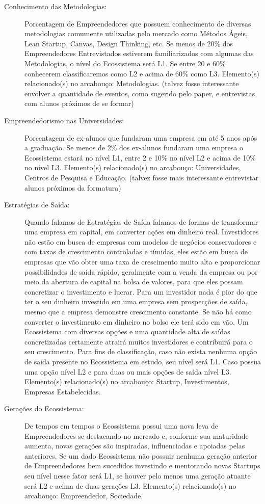 \begin{description}
  \item [Conhecimento das Metodologias:] Porcentagem de Empreendedores que possuem conhecimento de diversas metodologias comumente utilizadas pelo mercado como Métodos Ágeis, Lean Startup, Canvas, Design Thinking, etc. Se menos de 20\% dos Empreendedores Entrevistados estiverem familiarizados com algumas das Metodologias, o nível do Ecossistema será L1. Se entre 20 e 60\% conhecerem classificaremos como L2 e acima de 60\% como L3. Elemento(s) relacionado(s) no arcabouço: Metodologias. (talvez fosse interessante envolver a quantidade de eventos, como sugerido pelo paper, e entrevistas com alunos próximos de se formar)
  
  \item [Empreendedorismo nas Universidades:] Porcentagem de ex-alunos que fundaram uma empresa em até 5 anos após a graduação. Se menos de 2\% dos ex-alunos fundaram uma empresa o Ecossistema estará no nível L1, entre 2 e 10\% no nível L2 e acima de 10\% no nível L3. Elemento(s) relacionado(s) no arcabouço: Universidades, Centros de Pesquisa e Educação. (talvez fosse mais interessante entrevistar alunos próximos da formatura)
  
  \item [Estratégias de Saída:] Quando falamos de Estratégias de Saída falamos de formas de transformar uma empresa em capital, em converter ações em dinheiro real. Investidores não estão em busca de empresas com modelos de negócios conservadores e com taxas de crescimento controladas e tímidas, eles estão em busca de empresas que vão obter uma taxa de crescimento muito alta e proporcionar possibilidades de saída rápido, geralmente com a venda da empresa ou por meio da abertura de capital na bolsa de valores, para que eles possam concretizar o investimento e lucrar. Para um investidor nada é pior do que ter o seu dinheiro investido em uma empresa sem prospecções de saída, mesmo que a empresa demonstre crescimento constante. Se não há como converter o investimento em dinheiro no bolso ele terá sido em vão. Um Ecossistema com diversas opções e uma quantidade alta de saídas concretizadas certamente atrairá muitos investidores e contribuirá para o seu crescimento. Para fins de classificação, caso não exista nenhuma opção de saída presente no Ecossistema em estudo, seu nível será L1. Caso possua uma opção nível L2 e para duas ou mais opções de saída nível L3. Elemento(s) relacionado(s) no arcabouço: Startup, Investimentos, Empresas Estabelecidas.
  
  \item [Gerações do Ecossistema:] De tempos em tempos o Ecossistema possui uma nova leva de Empreendedores se destacando no mercado e, conforme sua maturidade aumenta, novas gerações são inspiradas, influenciadas e apoiadas pelas anteriores. Se um dado Ecossistema não possuir nenhuma geração anterior de Empreendedores bem sucedidos investindo e mentorando novas Startups seu nível nesse fator será L1, se houver pelo menos uma geração atuante será L2 e acima de duas gerações L3. Elemento(s) relacionado(s) no arcabouço: Empreendedor, Sociedade.
  

\end{description}
